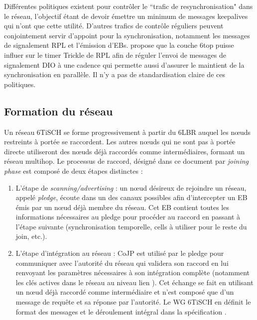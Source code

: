 \documentclass[]{report}
\begin{document}
\par Différentes politiques existent pour contrôler le ``trafic de resynchronisation" dans le réseau, l'objectif étant de devoir émettre un minimum de messages keepalives qui n'ont que cette utilité. D'autres trafics de contrôle réguliers peuvent conjointement servir d'appoint pour la synchronisation, notamment les messages de signalement RPL et l'émission d'EBs. \cite{ietf-6tisch-architecture-28} propose que la couche 6top puisse influer sur le timer Trickle de RPL afin de réguler l'envoi de messages de signalement DIO à une cadence qui permette aussi d'assurer le maintient de la synchronisation en parallèle. Il n'y a pas de standardisation claire de ces politiques.

\newpage

	\subsection{Formation du réseau}
	\label{joinphase}
	
Un réseau 6TiSCH se forme progressivement à partir du 6LBR auquel les nœuds restreints à portée se raccordent. Les autres nœuds qui ne sont pas à portée directe utiliseront des nœuds déjà raccordés comme intermédiaires, formant un réseau multihop. Le processus de raccord, désigné dans ce document par \textit{joining phase} est composé de deux étapes distinctes : 
\vspace{0.1cm}
\begin{enumerate}
\item L'étape de \textit{scanning/advertising} : un nœud désireux de rejoindre un réseau, appelé \textit{pledge}, écoute dans un des canaux possibles afin d'intercepter un EB émis par un nœud déjà membre du réseau. Cet EB contient toutes les informations nécessaires au pledge pour procéder au raccord en passant à l'étape suivante (synchronisation temporelle, cells à utiliser pour le reste du join, etc.).   
\vspace{0.1cm}
\item L'étape d'intégration au réseau : CoJP est utilisé par le pledge pour communiquer avec l'autorité du réseau qui validera son raccord en lui renvoyant les paramètres nécessaires à son intégration complète (notamment les clés actives dans le réseau au niveau lien ). Cet échange se fait en utilisant un nœud déjà raccordé comme intermédiaire et n'est composé que d'un message de requête et sa réponse par l'autorité. Le WG 6TiSCH en définit le format des messages et le déroulement intégral dans la spécification \cite{ietf-6tisch-minimal-security-15}.
\end{enumerate}
\end{document}
